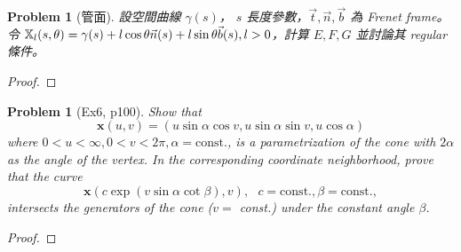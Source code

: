 \documentclass[10pt,a4paper]{article}
\newcounter{theProblemCounter}
\newtheorem{problem}[theProblemCounter]{Problem}
\begin{document}
\setcounter{theProblemCounter}{2}
\begin{problem}[管面]
設空間曲線 $\gamma(s)$， $s$ 長度參數，$\vec{t}, \vec{n}, \vec{b}$ 為 Frenet frame。令 $\mathbb{X}_l(s,\theta)=\gamma(s)+l\cos\theta\vec{n}(s) + l\sin\theta\vec{b}(s), l>0$，計算 $E, F, G$ 並討論其 regular 條件。
\end{problem}
\begin{proof}
\end{proof}

\setcounter{theProblemCounter}{5}
\begin{problem}[Ex6, p100]
Show that
\[ \mathbf{x}(u, v) = (u\sin\alpha\cos v, u\sin\alpha\sin v, u\cos\alpha)
\]
where $0<u<\infty, 0<v<2\pi, \alpha=\mbox{const.}$,
is a parametrization of the cone with $2\alpha$ as the angle of the vertex. In the corresponding coordinate neighborhood, prove that the curve
\[
\mathbf{x}(c\exp(v\sin\alpha \cot \beta), v),\ \ \ c=\mbox{const.}, \beta = \mbox{const.},
\]
intersects the generators of the cone ($v=$ const.) under the constant angle $\beta$.
\end{problem}
\begin{proof}
\end{proof}
\end{document}
